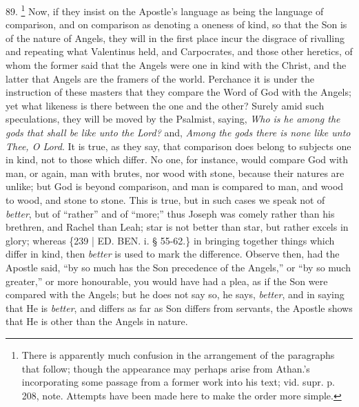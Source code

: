 89. \footnote{There is apparently much confusion in the arrangement of the
paragraphs that follow; though the appearance may perhaps arise from
Athan.'s incorporating some passage from a former work into his text;
vid. supr. p. 208, note. Attempts have been made here to make the
order more simple.} Now, if they insist on the Apostle's language as being the
language of comparison, and on comparison as denoting a oneness of
kind, so that the Son is of the nature of Angels, they will in the
first place incur the disgrace of rivalling and repeating what
Valentinus held, and Carpocrates, and those other heretics, of whom
the former said that the Angels were one in kind with the Christ, and
the latter that Angels are the framers of the world. Perchance it is
under the instruction of these masters that they compare the Word of
God with the Angels; yet what likeness is there between the one and
the other? Surely amid such speculations, they will be moved by the
Psalmist, saying, \emph{Who is he among the gods that shall be like unto
the Lord?} and, \emph{Among the gods there is none like unto Thee, O
Lord}. It is true, as they say, that comparison does belong to
subjects one in kind, not to those which differ. No one, for instance,
would compare God with man, or again, man with brutes, nor wood with
stone, because their natures are unlike; but God is beyond comparison,
and man is compared to man, and wood to wood, and stone to stone. This
is true, but in such cases we speak not of \emph{better}, but of ``rather''
and of ``more;'' thus Joseph was comely rather than his brethren, and
Rachel than Leah; star is not better than star, but rather excels in
glory; whereas \{239 | ED.
BEN.
i. § 55-62.\} in bringing together things which differ in kind, then \emph{better}
is used to mark the difference. Observe then, had the Apostle said, ``by
so much has the Son precedence of the Angels,'' or ``by so much greater,''
or more honourable, you would have had a plea, as if the Son were
compared with the Angels; but he does not say so, he says, \emph{better},
and in saying that He is \emph{better}, and differs as far as Son
differs from servants, the Apostle shows that He is other than the
Angels in nature.

